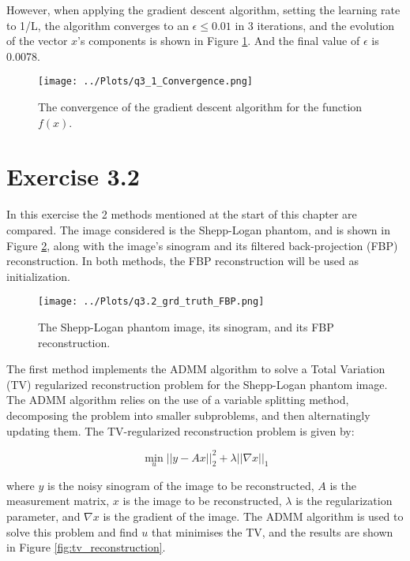 \documentclass[12pt]{report} %
\begin{document}
However, when applying the gradient descent algorithm, setting the learning rate to 1/L, the algorithm converges to an $\epsilon \leq 0.01$ in 3 iterations, and the evolution of the vector $x$'s components is shown in Figure \ref{fig:gradient_descent}. And the final value of $\epsilon$ is 0.0078.

\begin{figure}[htbp]
    \centering
    \texttt{[image: ../Plots/q3\_1\_Convergence.png]}
    \caption{The convergence of the gradient descent algorithm for the function $f(x)$.}
    \label{fig:gradient_descent}
\end{figure}



\section{Exercise 3.2}

In this exercise the 2 methods mentioned at the start of this chapter are compared. The image considered is the Shepp-Logan phantom, and is shown in Figure \ref{fig:fbp_reconstruction}, along with the image's sinogram and its filtered back-projection (FBP) reconstruction. In both methods, the FBP reconstruction will be used as initialization.

\begin{figure}[htbp]
    \centering
    \texttt{[image: ../Plots/q3.2\_grd\_truth\_FBP.png]}
    \caption{The Shepp-Logan phantom image, its sinogram, and its FBP reconstruction.}
    \label{fig:fbp_reconstruction}
\end{figure}

The first method implements the ADMM algorithm to solve a Total Variation (TV) regularized reconstruction problem for the Shepp-Logan phantom image. The ADMM algorithm relies on the use of a variable splitting method, decomposing the problem into smaller subproblems, and then alternatingly updating them\cite{boyd2011distributed}. The TV-regularized reconstruction problem is given by:

\begin{equation}
    \min_{u} ||y - Ax||^2_2 + \lambda ||\nabla x||_1
\end{equation}

where $y$ is the noisy sinogram of the image to be reconstructed, $A$ is the measurement matrix, $x$ is the image to be reconstructed, $\lambda$ is the regularization parameter, and $\nabla x$ is the gradient of the image. The ADMM algorithm is used to solve this problem and find $u$ that minimises the TV, and the results are shown in Figure \ref{fig:tv_reconstruction}.
\end{document}
